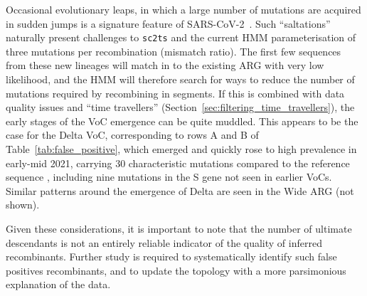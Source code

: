 \documentclass{article}
\begin{document}
Occasional evolutionary leaps, in which a large number of mutations
are acquired in sudden jumps
is a signature feature of SARS-CoV-2~\citep{Corey2021-sars,Nielsen2023-host}.
Such ``saltations'' naturally present challenges to \texttt{sc2ts} and the
current HMM parameterisation of three mutations per recombination (mismatch
ratio). The first few sequences from these new lineages will match in to
the existing ARG with very low likelihood, and the HMM will therefore
search for ways to reduce the number of mutations required by recombining
in segments. If this is combined with data quality issues and
``time travellers'' (Section~\ref{sec:filtering_time_travellers}),
the early stages of the VoC emergence can be quite muddled.
This appears to be the case for the Delta VoC,
corresponding to rows A and B of Table~\ref{tab:false_positive},
which emerged and quickly rose to high prevalence in early-mid 2021,
carrying 30 characteristic mutations compared to the reference sequence 
\citep{McCrone2022-context}, including nine mutations in the S gene 
not seen in earlier VoCs.
Similar patterns around the emergence of Delta are seen in the Wide ARG
(not shown).

Given these considerations, it  is important to note that the
number of ultimate descendants is not an entirely reliable
indicator of the quality of inferred recombinants.
Further study is required to systematically identify such false
positives recombinants, and to update the topology with a
more parsimonious explanation of the data.
\end{document}
